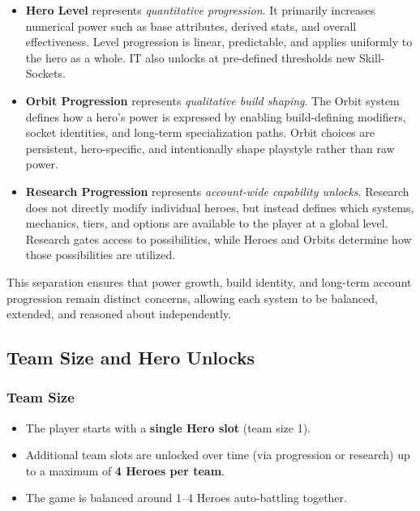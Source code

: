 \begin{itemize}
	\item \textbf{Hero Level} represents \textit{quantitative progression}.  
	It primarily increases numerical power such as base attributes, derived stats, and overall effectiveness.
	Level progression is linear, predictable, and applies uniformly to the hero as a whole. IT also unlocks at pre-defined thresholds new Skill-Sockets.
	
	\item \textbf{Orbit Progression} represents \textit{qualitative build shaping}.  
	The Orbit system defines how a hero's power is expressed by enabling build-defining modifiers, socket identities, and long-term specialization paths.
	Orbit choices are persistent, hero-specific, and intentionally shape playstyle rather than raw power.
	
	\item \textbf{Research Progression} represents \textit{account-wide capability unlocks}.  
	Research does not directly modify individual heroes, but instead defines which systems, mechanics, tiers, and options are available to the player at a global level.
	Research gates access to possibilities, while Heroes and Orbits determine how those possibilities are utilized.
\end{itemize}

This separation ensures that power growth, build identity, and long-term account progression remain distinct concerns, allowing each system to be balanced, extended, and reasoned about independently.

\subsection{Team Size and Hero Unlocks}

\subsubsection*{Team Size}

\begin{itemize}
	\item The player starts with a \textbf{single Hero slot} (team size 1).
	\item Additional team slots are unlocked over time (via progression or research) up to a maximum of \textbf{4 Heroes per team}.
	\item The game is balanced around 1--4 Heroes auto-battling together.
\end{itemize}

